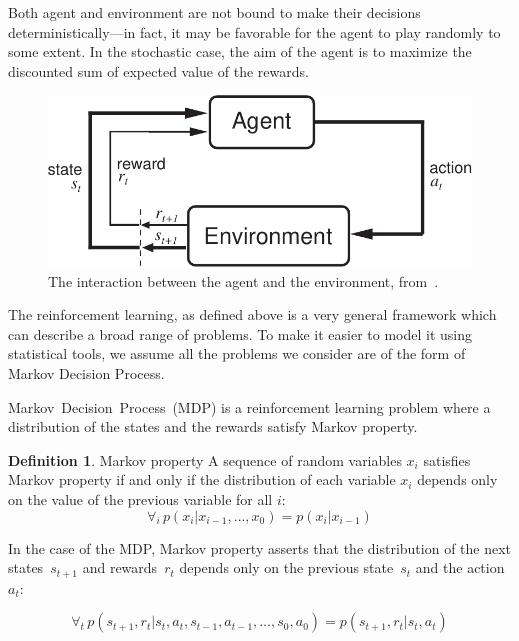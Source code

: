 Both agent and environment are not bound to make their decisions deterministically---in fact, it may be favorable for the agent to play randomly to some extent. In the stochastic case, the aim of the agent is to maximize the discounted sum of expected value of the rewards.

\begin{figure}[!h]
  \center
  \includegraphics[scale=0.8]{images/Agent-Env-crop.pdf}
  \caption{The interaction between the agent and the environment, from~\cite[Chapter 3.1]{reinforcement-book}.}
\end{figure}

The reinforcement learning, as defined above is a very general framework which can describe a broad range of problems. To make it easier to model it using statistical tools, we assume all the problems we consider are of the form of Markov Decision Process.

Markov~Decision~Process~(MDP) \cite[Chapter 3.6]{reinforcement-book} is a reinforcement learning problem where a distribution of the states and the rewards satisfy Markov property.
\theoremstyle{definition}
\newtheorem{definition}{Definition}
\begin{definition}{Markov property} \label{mdp}
A sequence of random variables $x_i$ satisfies Markov property if and only if the distribution of each variable $x_i$ depends only on the value of the previous variable for all $i$:
  \begin{equation}
    \forall_i\, p(x_i|x_{i-1}, \ldots, x_{0}) = p(x_i | x_{i-1})
  \end{equation}

  In the case of the MDP, Markov property asserts that the distribution of the next states~$s_{t+1}$ and rewards~$r_t$ depends only on the previous state~$s_t$ and the action~$a_t$:

\begin{equation}
\forall_t\, p(s_{t+1}, r_t|s_t, a_t, s_{t-1}, a_{t-1}, \ldots, s_0, a_0) = p(s_{t+1}, r_t|s_t, a_t)
\end{equation}
\end{definition}

